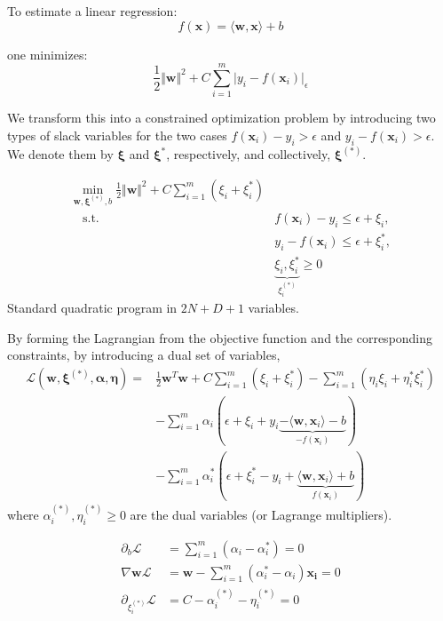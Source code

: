 \documentclass[10pt,landscape]{article}
\begin{document}
\begin{multicols}{3}
To estimate a linear regression:
\begin{equation*}
f\left(\mathbf{x}\right) = \langle \mathbf{w}, \mathbf{x} \rangle + b
\end{equation*}

one minimizes:
\begin{equation*}
\frac{1}{2} \Vert \mathbf{w} \Vert^2 + C \sum_{i=1}^{m} \vert y_i -  f\left(\mathbf{x}_i\right) \vert_{\epsilon}
\end{equation*}

We transform this into a constrained optimization problem by introducing two types of slack variables for the two cases $f\left(\mathbf{x}_i\right) - y_i > \epsilon$ and $y_i - f\left(\mathbf{x}_i\right) > \epsilon$. We denote them by $\mathbf{\xi}$ and $\mathbf{\xi}^{*}$, respectively, and collectively, $\mathbf{\xi}^{(*)}$.

\begin{align*}
\min_{\mathbf{w}, \mathbf{\xi}^{(*)}, b}\frac{1}{2}\Vert \mathbf{w} \Vert^2 + C\sum_{i=1}^{m} \left( \xi_i + \xi_i^{*} \right) & \\
\quad \textrm{s.t. } & f\left(\mathbf{x}_i\right) - y_i \leq \epsilon + \xi_i,\\
& y_i - f\left(\mathbf{x}_i\right) \leq \epsilon + \xi_i^{*},\\
& \underbrace{\xi_i, \xi_i^{*}}_{\xi_i^{(*)}} \geq 0
\end{align*}
Standard quadratic program in $2N+D+1$ variables.

By forming the Lagrangian from the objective function and the corresponding constraints, by introducing a dual set of variables,
\begin{align*}
\mathcal{L}\left( \mathbf{w}, \mathbf{\xi}^{(*)}, \mathbf{\alpha}, \mathbf{\eta}\right) = & \frac{1}{2}\mathbf{w}^T\mathbf{w}+C\sum_{i=1}^{m} \left( \xi_i + \xi_i^{*} \right)-\sum_{i=1}^{m} \left( \eta_i \xi_i + \eta_i^{*}\xi_i^{*} \right) \\
&  - \sum_{i=1}^{m} \alpha_i \left( \epsilon + \xi_i + y_i \underbrace{- \langle \mathbf{w}, \mathbf{x}_ i\rangle - b}_{-f\left(\mathbf{x}_i\right)} \right) \\
& - \sum_{i=1}^{m} \alpha_i^{*} \left( \epsilon + \xi_i^{*} - y_i + \underbrace{\langle \mathbf{w}, \mathbf{x}_ i\rangle + b}_{f\left(\mathbf{x}_i\right)} \right)
\end{align*}
where $\alpha_i^{(*)},  \eta_i^{(*)}\geq 0$ are the dual variables (or Lagrange multipliers). 

\begin{align*}
\partial_b \mathcal{L} & = \sum_{i=1}^{m} \left( \alpha_i - \alpha_i^{*} \right) = 0 \\
\nabla {\mathbf{w}} \mathcal{L} & = \mathbf{w} - \sum_{i=1}^{m} \left( \alpha_i^{*} - \alpha_i \right) \mathbf{x_i} = 0 \\
\partial_{\xi_i^{(*)}} \mathcal{L} & = C - \alpha_i^{(*)} - \eta_i^{(*)} = 0 
\end{align*}


\end{multicols}
\end{document}
